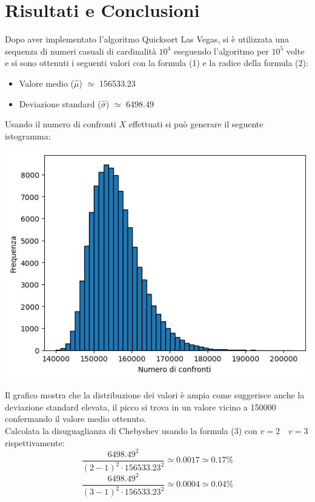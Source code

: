 \documentclass[12pt]{article}
\begin{document}
\section{Risultati e Conclusioni}
Dopo aver implementato l'algoritmo Quicksort Las Vegas, 
si è utilizzata una sequenza di numeri casuali di 
cardinalità $10^{4}$ eseguendo l'algoritmo per $10^{5}$ 
volte e si sono ottenuti i seguenti valori con la formula (1) e la radice della formula (2):
\begin{itemize}
    \item Valore medio ($\hat{\mu}$) $\simeq $ 156533.23
    \item Deviazione standard ($\hat{\sigma}$) $\simeq$ 6498.49
\end{itemize}
\newpage
Usando il numero di confronti $X$ effettuati si può generare il seguente 
istogramma:
\begin{center}
    \includegraphics[scale=1]{Istogramma.png}
\end{center}
Il grafico mostra che la distribuzione dei valori è ampia come suggerisce anche la deviazione standard elevata, il picco si trova in un 
valore vicino a 150000 confermando il valore medio ottenuto.\\
Calcolata la disuguaglianza di Chebyshev usando la formula (3)
con $v=2 \quad v=3$ rispettivamente:
\begin{equation*}
    \frac{6498.49^{2}}{(2-1)^{2}\cdot 156533.23^{2}} \simeq 0.0017 
    \simeq 0.17\%
\end{equation*}
\begin{equation*}
    \frac{6498.49^{2}}{(3-1)^{2}\cdot 156533.23^{2}} \simeq 0.0004 
    \simeq 0.04\%
\end{equation*}
\end{document}

